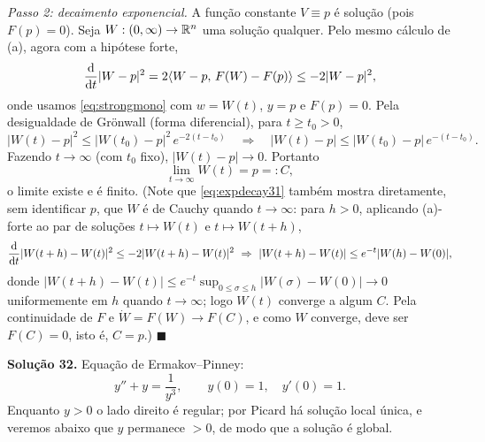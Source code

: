 \begin{enumerate}[label=(\alph*)]
\emph{Passo 2: decaimento exponencial.}
A função constante $V\equiv p$ é solução (pois $F(p)=0$). Seja $W:(0,\infty)\to\mathbb{R}^n$ uma solução qualquer. Pelo mesmo cálculo de (a), agora com a hipótese forte,
\[
\frac{\mathrm{d}}{\mathrm{d} t}|W-p|^2=2\langle W-p,\,F(W)-F(p)\rangle\le -2|W-p|^2 ,
\]
onde usamos \eqref{eq:strongmono} com $w=W(t)$, $y=p$ e $F(p)=0$. Pela desigualdade de Grönwall (forma diferencial), para $t\ge t_0>0$,
\begin{equation}\label{eq:expdecay31}
|W(t)-p|^2\le |W(t_0)-p|^2\,e^{-2(t-t_0)}\quad\Longrightarrow\quad |W(t)-p|\le |W(t_0)-p|\,e^{-(t-t_0)} .
\end{equation}
Fazendo $t\to\infty$ (com $t_0$ fixo), $|W(t)-p|\to0$. Portanto
\[
\lim_{t\to\infty}W(t)=p=:C ,
\]
o limite existe e é finito. (Note que \eqref{eq:expdecay31} também mostra diretamente, sem identificar $p$, que $W$ é de Cauchy quando $t\to\infty$: para $h>0$, aplicando (a)-forte ao par de soluções $t\mapsto W(t)$ e $t\mapsto W(t+h)$,
\[
\frac{\mathrm{d}}{\mathrm{d} t}|W(t+h)-W(t)|^2\le-2|W(t+h)-W(t)|^2\ \Rightarrow\ |W(t+h)-W(t)|\le e^{-t}|W(h)-W(0)| ,
\]
donde $|W(t+h)-W(t)|\le e^{-t}\sup_{0\le \sigma\le h}|W(\sigma)-W(0)|\to0$ uniformemente em $h$ quando $t\to\infty$; logo $W(t)$ converge a algum $C$. Pela continuidade de $F$ e $\dot W=F(W)\to F(C)$, e como $W$ converge, deve ser $F(C)=0$, isto é, $C=p$.) \qquad$\blacksquare$

\end{enumerate}


\bigskip\noindent\textbf{Solução 32.}\quad
Equação de Ermakov--Pinney:
\[
y''+y=\frac1{y^3},\qquad y(0)=1,\quad y'(0)=1 .
\]
Enquanto $y>0$ o lado direito é regular; por Picard há solução local única, e veremos abaixo que $y$ permanece $>0$, de modo que a solução é global.

